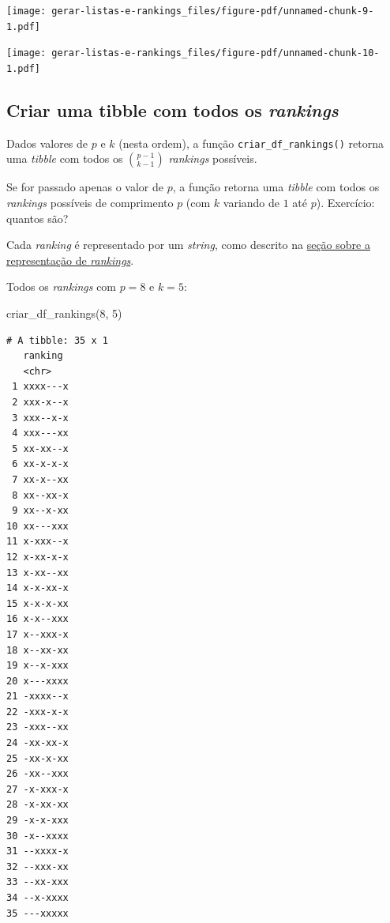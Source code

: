 \documentclass[
  letterpaper,
  DIV=11,
  numbers=noendperiod]{scrreprt}
\newenvironment{Shaded}{\begin{snugshade}}{\end{snugshade}}
\newcommand{\DecValTok}[1]{\textcolor[rgb]{0.68,0.00,0.00}{#1}}
\newcommand{\FunctionTok}[1]{\textcolor[rgb]{0.28,0.35,0.67}{#1}}
\newcommand{\NormalTok}[1]{\textcolor[rgb]{0.00,0.23,0.31}{#1}}
\newcommand{\SpecialCharTok}[1]{\textcolor[rgb]{0.37,0.37,0.37}{#1}}
\begin{document}
\begin{center}
\texttt{[image: gerar-listas-e-rankings\_files/figure-pdf/unnamed-chunk-9-1.pdf]}
\end{center}

\begin{Shaded}
\end{Shaded}

\begin{center}
\texttt{[image: gerar-listas-e-rankings\_files/figure-pdf/unnamed-chunk-10-1.pdf]}
\end{center}

\subsection{\texorpdfstring{Criar uma tibble com todos os
\emph{rankings}}{Criar uma tibble com todos os rankings}}\label{criar-uma-tibble-com-todos-os-rankings}

Dados valores de $p$ e $k$ (nesta ordem), a função
\texttt{criar\_df\_rankings()} retorna uma \emph{tibble} com todos os
$\binom{p - 1}{k - 1}$ \emph{rankings} possíveis.

Se for passado apenas o valor de $p$, a função retorna uma \emph{tibble}
com todos os \emph{rankings} possíveis de comprimento $p$ (com $k$
variando de $1$ até $p$). Exercício: quantos são?

Cada \emph{ranking} é representado por um \emph{string}, como descrito
na \hyperref[sec-repr]{seção sobre a representação de \emph{rankings}}.

Todos os \emph{rankings} com $p = 8$ e $k = 5$:

\begin{Shaded}
\begin{Highlighting}[]
\FunctionTok{criar\_df\_rankings}\NormalTok{(}\DecValTok{8}\NormalTok{, }\DecValTok{5}\NormalTok{)}
\end{Highlighting}
\end{Shaded}

\begin{verbatim}
# A tibble: 35 x 1
   ranking 
   <chr>   
 1 xxxx---x
 2 xxx-x--x
 3 xxx--x-x
 4 xxx---xx
 5 xx-xx--x
 6 xx-x-x-x
 7 xx-x--xx
 8 xx--xx-x
 9 xx--x-xx
10 xx---xxx
11 x-xxx--x
12 x-xx-x-x
13 x-xx--xx
14 x-x-xx-x
15 x-x-x-xx
16 x-x--xxx
17 x--xxx-x
18 x--xx-xx
19 x--x-xxx
20 x---xxxx
21 -xxxx--x
22 -xxx-x-x
23 -xxx--xx
24 -xx-xx-x
25 -xx-x-xx
26 -xx--xxx
27 -x-xxx-x
28 -x-xx-xx
29 -x-x-xxx
30 -x--xxxx
31 --xxxx-x
32 --xxx-xx
33 --xx-xxx
34 --x-xxxx
35 ---xxxxx
\end{verbatim}
\end{document}
